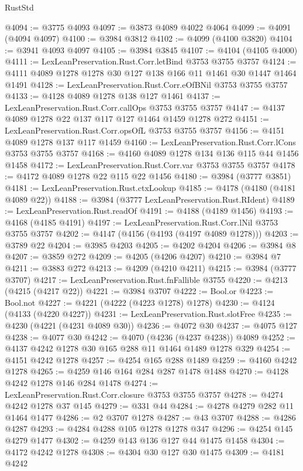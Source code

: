 \begin{lexlean}{RustStd}
\begin{coremodule}
@4094 := @3775 @4093
@4097 := @3873 @4089 @4022 @4064
@4099 := @4091 (@4094 @4097)
@4100 := @3984 @3812
@4102 := @4099 (@4100 @3820)
@4104 := @3941 @4093 @4097
@4105 := @3984 @3845
@4107 := @4104 (@4105 @4000)
@4111 := LexLeanPreservation.Rust.Corr.letBind @3753 @3755 @3757
@4124 := @4111 @4089 @1278 @1278 @30 @127 @138 @166 @11 @1461 @30 @1447 @1464 @1491
@4128 := LexLeanPreservation.Rust.Corr.eOfBNil @3753 @3755 @3757
@4133 := @4128 @4089 @1278 @138 @127 @1461
@4137 := LexLeanPreservation.Rust.Corr.callOps @3753 @3755 @3757
@4147 := @4137 @4089 @1278 @22 @137 @117 @127 @1464 @1459 @1278 @272
@4151 := LexLeanPreservation.Rust.Corr.opsOfL @3753 @3755 @3757
@4156 := @4151 @4089 @1278 @137 @117 @1459
@4160 := LexLeanPreservation.Rust.Corr.lCons @3753 @3755 @3757
@4168 := @4160 @4089 @1278 @134 @136 @115 @44 @1456 @1458
@4172 := LexLeanPreservation.Rust.Corr.var @3753 @3755 @3757
@4178 := @4172 @4089 @1278 @22 @115 @22 @1456
@4180 := @3984 (@3777 @3851)
@4181 := LexLeanPreservation.Rust.ctxLookup
@4185 := @4178 (@4180 (@4181 @4089 @22))
@4188 := @3984 (@3777 LexLeanPreservation.Rust.RIdent)
@4189 := LexLeanPreservation.Rust.readOf
@4191 := @4188 (@4189 @1456)
@4193 := @4168 (@4185 @4191)
@4197 := LexLeanPreservation.Rust.Corr.lNil @3753 @3755 @3757
@4202 := @4147 (@4156 (@4193 (@4197 @4089 @1278)))
@4203 := @3789 @22
@4204 := @3985 @4203
@4205 := @4202 @4204
@4206 := @3984 @8
@4207 := @3859 @272
@4209 := @4205 (@4206 @4207)
@4210 := @3984 @7
@4211 := @3883 @272
@4213 := @4209 (@4210 @4211)
@4215 := @3984 (@3777 @3707)
@4217 := LexLeanPreservation.Rust.fnFallible @3755
@4220 := @4213 (@4215 (@4217 @22))
@4221 := @3984 @3707
@4222 := Bool.or
@4223 := Bool.not
@4227 := @4221 (@4222 (@4223 @1278) @1278)
@4230 := @4124 (@4133 (@4220 @4227))
@4231 := LexLeanPreservation.Rust.slotFree
@4235 := @4230 (@4221 (@4231 @4089 @30))
@4236 := @4072 @30
@4237 := @4075 @127
@4238 := @4077 @30
@4242 := @4070 (@4236 (@4237 @4238)) @4089
@4252 := @4137 @4242 @1278 @30 @165 @288 @11 @1464 @1489 @1278 @329
@4254 := @4151 @4242 @1278
@4257 := @4254 @165 @288 @1489
@4259 := @4160 @4242 @1278
@4265 := @4259 @146 @164 @284 @287 @1478 @1488
@4270 := @4128 @4242 @1278 @146 @284 @1478
@4274 := LexLeanPreservation.Rust.Corr.closure @3753 @3755 @3757
@4278 := @4274 @4242 @1278 @37 @145
@4279 := @331 @44
@4284 := @4278 @4279 @282 @11 @1464 @1477
@4286 := @2 @3707 @1278
@4287 := @43 @3707
@4288 := @4286 @4287
@4293 := @4284 @4288 @105 @1278 @1278 @347
@4296 := @4254 @145 @4279 @1477
@4302 := @4259 @143 @136 @127 @44 @1475 @1458
@4304 := @4172 @4242 @1278
@4308 := @4304 @30 @127 @30 @1475
@4309 := @4181 @4242

\end{coremodule}
\end{lexlean}

